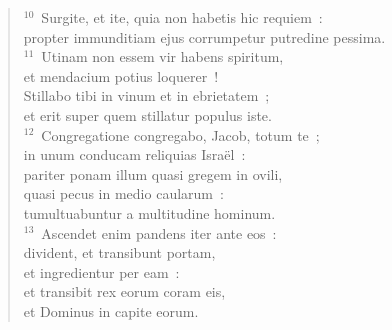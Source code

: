 \begin{flushleft}
\begin{verse}
${}^{10}$~Surgite, et ite, quia non habetis hic requiem~:\\ propter immunditiam ejus corrumpetur putredine pessima.\\
${}^{11}$~Utinam non essem vir habens spiritum,\\ et mendacium potius loquerer~!\\ Stillabo tibi in vinum et in ebrietatem~;\\ et erit super quem stillatur populus iste.\\
${}^{12}$~Congregatione congregabo, Jacob, totum te~;\\ in unum conducam reliquias Isra\"el~:\\ pariter ponam illum quasi gregem in ovili,\\ quasi pecus in medio caularum~:\\ tumultuabuntur a multitudine hominum.\\
${}^{13}$~Ascendet enim pandens iter ante eos~:\\ divident, et transibunt portam,\\ et ingredientur per eam~:\\ et transibit rex eorum coram eis,\\ et Dominus in capite eorum.\end{verse}\end{flushleft}


